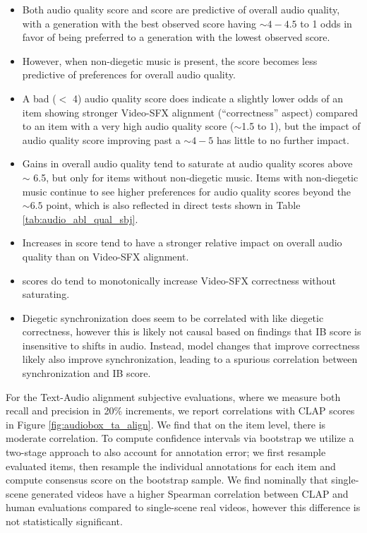 \begin{itemize}
    \item Both audio quality score and \IB score are predictive of overall audio quality, with a generation with the best observed \IB score having $\sim 4-4.5$ to 1 odds in favor of being preferred to a generation with the lowest observed \IB score.
    \item However, when non-diegetic music is present, the \IB score becomes less predictive of preferences for overall audio quality.
    \item A bad ($<$ 4) audio quality score does indicate a slightly lower odds of an item showing stronger Video-SFX alignment (``correctness'' aspect) compared to an item with a very high audio quality score ($\sim$1.5 to 1), but the impact of audio quality score improving past a $\sim4-5$ has little to no further impact.
    \item Gains in overall audio quality tend to saturate at audio quality scores above $\sim$ 6.5, but only for items without non-diegetic music. Items with non-diegetic music continue to see higher preferences for audio quality scores beyond the $\sim6.5$ point, which is also reflected in direct tests shown in Table \ref{tab:audio_abl_qual_sbj}.
    \item Increases in \IB score tend to have a stronger relative impact on overall audio quality than on Video-SFX alignment.
    \item \IB scores do tend to monotonically increase Video-SFX correctness without saturating.
    \item Diegetic synchronization does seem to be correlated with \IB like diegetic correctness, however this is likely not causal based on findings that IB score is insensitive to shifts in audio. Instead, model changes that improve correctness likely also improve synchronization, leading to a spurious correlation between synchronization and IB score.
\end{itemize}


For the Text-Audio alignment subjective evaluations, where we measure both recall and precision in 20\% increments, we report correlations with CLAP \citep{wu2023clap} scores in Figure \ref{fig:audiobox_ta_align}. We find that on the item level, there is moderate correlation. To compute confidence intervals via bootstrap we utilize a two-stage approach to also account for annotation error; we first resample evaluated items, then resample the individual annotations for each item
and compute consensus score on the bootstrap sample. We find nominally that single-scene generated videos have a higher Spearman correlation between CLAP and human evaluations compared to single-scene real videos, however this difference is not statistically significant.
